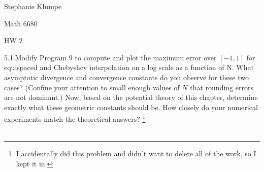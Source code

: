 \documentclass[12pt]{article}
\begin{document}
\noindent Stephanie Klumpe

\noindent Math 6680

\noindent HW 2

5.1.Modify Program 9 to compute and plot the maximum error over $[-1,1]$ for equispaced and Chebyshev interpolation on a log scale as a function of N. What asymptotic divergence and convergence constants do you observe for these two cases? (Confine your attention to small enough values of $N$ that rounding errors are not dominant.) Now, based on the potential theory of this chapter, determine exactly what these geometric constants should be. How closely do your numerical experiments match the theoretical answers?
\footnote{I accidentally did this problem and didn't want to delete all of the work, so I kept it in.}\\\\
\end{document}
